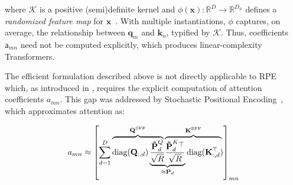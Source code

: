 where $\mathcal{K}$ is a positive (semi)definite kernel and $\phi(\mathbf{x}): \mathbb{R}^D \to \mathbb{R}^{D_\phi}$ defines a \textit{randomized feature map} for $\mathbf{x}$~\cite{tsai_transformer_2019, choromanski_rethinking_2021}. With multiple instantiations, $\phi$ captures, on average, the relationship between $\mathbf{q}_m$ and $\mathbf{k}_n$, typified by $\mathcal{K}$. Thus, coefficients $\mathsf{a}_{mn}$ need not be computed explicitly, which produces linear-complexity Transformers.

The efficient formulation described above is not directly applicable to RPE which, as introduced in \cite{shaw_rpe_2018}, requires the explicit computation of attention coefficients $a_{mn}$. This gap was addressed by Stochastic Positional Encoding~\cite{liutkus_relative_2021}, which approximates attention as:

\begin{equation} \label{eq:spe:ohyeah}
a_{mn} \approx \left[ \sum_{d=1}^D
    \lefteqn{\overbrace{\phantom{
    \text{diag}(\mathbf{Q}_{:,d})
    \frac{
        \thicktilde{\mathbf{P}}^Q_d
    }{\sqrt{R}}
    }}^{
    \mathbf{Q}^{\text{SFF}}
    }}
    \text{diag}(\mathbf{Q}_{:,d})
    \underbrace{
    \frac{
        \thicktilde{\mathbf{P}}^Q_d
    }{\sqrt{R}}
    \lefteqn{\overbrace{\phantom{
    \frac{
        \thicktilde{\mathbf{P}}^K_d{}^\top
    }{\sqrt{R}}
    \text{diag}(\mathbf{K}^\top_{:,d})
    }}^{
    \mathbf{K}^{\text{SFF}}
    }}
    \frac{
        \thicktilde{\mathbf{P}}^K_d{}^\top
    }{\sqrt{R}}
    }_{
    \approx \mathbf{P}_d
    }
    \text{diag}(\mathbf{K}^\top_{:,d})
    \right]_{mn}
\end{equation}

